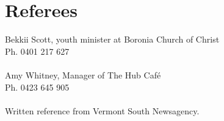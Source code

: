 \documentclass[a4paper]{article}
\begin{document}


\section{Referees}
Bekkii Scott, youth minister at Boronia Church of Christ \\
Ph. 0401 217 627\\ \\
Amy Whitney, Manager of The Hub Caf\'e \\
Ph. 0423 645 905\\ \\
Written reference from Vermont South Newsagency.

\end{document}
